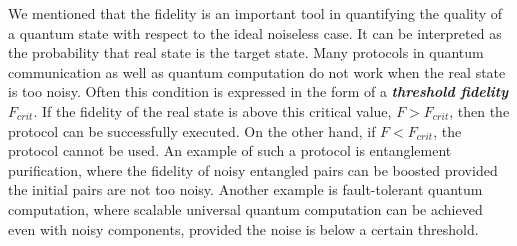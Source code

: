 We mentioned that the fidelity is an important tool in quantifying the quality of a quantum state with respect to the ideal noiseless case.
It can be interpreted as the probability that real state is the target state.
Many protocols in quantum communication as well as quantum computation do not work when the real state is too noisy.
Often this condition is expressed in the form of a \textbf{\emph{threshold fidelity}} $F_{crit}$.
If the fidelity of the real state is above this critical value, $F > F_{crit}$, then the protocol can be successfully executed.
On the other hand, if $F < F_{crit}$, the protocol cannot be used.
An example of such a protocol is entanglement purification, where the fidelity of noisy entangled pairs can be boosted provided the initial pairs are not too noisy.
Another example is fault-tolerant quantum computation, where scalable universal quantum computation can be achieved even with noisy components, provided the noise is below a certain threshold.


